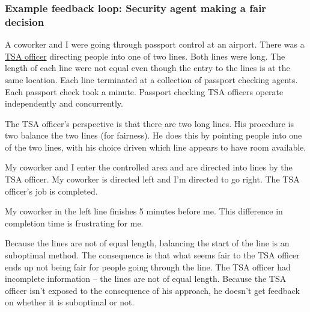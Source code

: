 \subsubsection{Example feedback loop: Security agent making a fair decision}
\begin{mdframed}
A coworker and I were going through passport control at an airport. 
There was a \href{https://en.wikipedia.org/wiki/Transportation_Security_Administration}{TSA officer} 
directing people into one of two lines. Both lines were long. The length of each line were not equal even though the entry to the lines is at the same location. Each line terminated at a collection of passport checking agents. Each passport check took a minute. Passport checking TSA officers operate independently and concurrently.


The TSA officer's perspective is that there are two long lines. His procedure is two balance the two lines (for fairness). He does this by pointing people into one of the two lines, with his choice driven which line appears to have room available.

My coworker and I enter the controlled area and are directed into lines by the TSA officer. My coworker is directed left and I'm directed to go right. The TSA officer's job is completed.

My coworker in the left line finishes 5 minutes before me. This difference in completion time is frustrating for me.

Because the lines are not of equal length, balancing the start of the line is an suboptimal method. The consequence is that what seems fair to the TSA officer ends up not being fair for people going through the line. The TSA officer had incomplete information -- the lines are not of equal length. Because the TSA officer isn't exposed to the consequence of his approach, he doesn't get feedback on whether it is suboptimal or not.
\end{mdframed}

